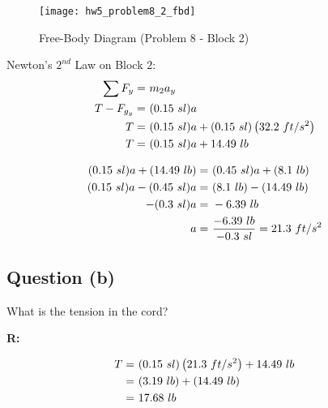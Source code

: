 		\begin{figure}[H]
			\begin{center}
				\texttt{[image: hw5\_problem8\_2\_fbd]}
				\caption{Free-Body Diagram (Problem 8 - Block 2)}
				\label{fig:hw5_problem8_2_fbd}
			\end{center}
		\end{figure}

		Newton's $2^{nd}$ Law on Block $2$:
		\begin{align}
			\sum F_{y} = \ &m_{2}a_{y}& \notag \\
			T - F_{g_{y}} = \ &(0.15 \ sl)a& \notag \\
			T = \ &(0.15 \ sl)a + (0.15 \ sl)\left(32.2 \ ft/s^{2}\right)& \notag \\
			T = \ &(0.15 \ sl)a + 14.49 \ lb& \notag
		\end{align}

		\begin{align}
			(0.15 \ sl)a + (14.49 \ lb) = \ &(0.45 \ sl)a + (8.1 \ lb)& \notag \\
			(0.15 \ sl)a - (0.45 \ sl)a = \ &(8.1 \ lb) - (14.49 \ lb)& \notag \\
			-(0.3 \ sl)a = \ &-6.39 \ lb& \notag \\
			a = \ &\frac{-6.39 \ lb}{-0.3 \ sl} = 21.3 \ ft/s^{2}&
		\end{align}

	\subsection{Question (b)}

		What is the tension in the cord?

		\textbf{R:} \newline

		\begin{align}
			T = \ &(0.15 \ sl)\left(21.3 \ ft/s^{2}\right) + 14.49 \ lb& \notag \\
			= \ &(3.19 \ lb) + (14.49 \ lb)& \notag \\
			= \ &17.68 \ lb&
		\end{align}
